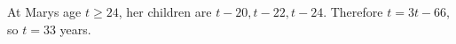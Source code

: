 At Mary\textquotesingle s age $t\ge24$, her children are $t-20,t-22,t-24$. Therefore $t=3t-66$, so $\boxed{t=33}$ years.
